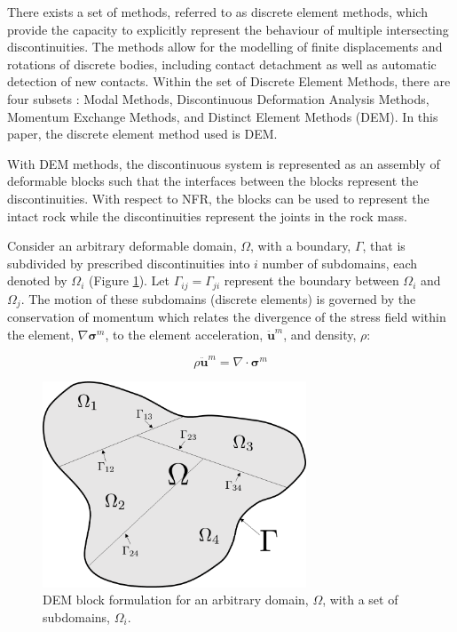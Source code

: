 There exists a set of methods, referred to as discrete element methods, which provide the capacity to explicitly represent the behaviour of multiple intersecting discontinuities. The methods allow for the modelling of finite displacements and rotations of discrete bodies, including contact detachment as well as automatic detection of new contacts. Within the set of Discrete Element Methods, there are four subsets \citep{CUNDALL_1992}: Modal Methods, Discontinuous Deformation Analysis Methods, Momentum Exchange Methods, and Distinct Element Methods (DEM). In this paper, the discrete element method used is DEM.

With DEM methods, the discontinuous system is represented as an assembly of deformable blocks such that the interfaces between the blocks represent the discontinuities. With respect to NFR, the blocks can be used to represent the intact rock while the discontinuities represent the joints in the rock mass. 

Consider an arbitrary deformable domain, $\Omega$, with a boundary, $\Gamma$, that is subdivided by prescribed discontinuities into $i$ number of subdomains, each denoted by $\Omega_i$ (Figure \ref{fig:DEM}). Let $\Gamma_{ij}=\Gamma_{ji}$ represent the boundary between $\Omega_i$ and $\Omega_j$. The motion of these subdomains (discrete elements) is governed by the conservation of momentum which relates the divergence of the stress field within the element, $\nabla\boldsymbol{\sigma}^m$, to the element acceleration, $\ddot{\mathbf{u}}^m$, and density, $\rho$:

\begin{equation}
\rho \ddot{\mathbf{u}}^m=\nabla\cdot\boldsymbol{\sigma}^m
\label{eqn:cauchy}
\end{equation}

\begin{figure}[!htb]
\begin{center}
\includegraphics[width=0.7\textwidth]{figures/DEM/demnew}
\caption{{\label{fig:DEM}DEM block formulation for an arbitrary domain, $\Omega$, with a set of subdomains, $\Omega_i$.%
}}
\end{center}
\end{figure}

